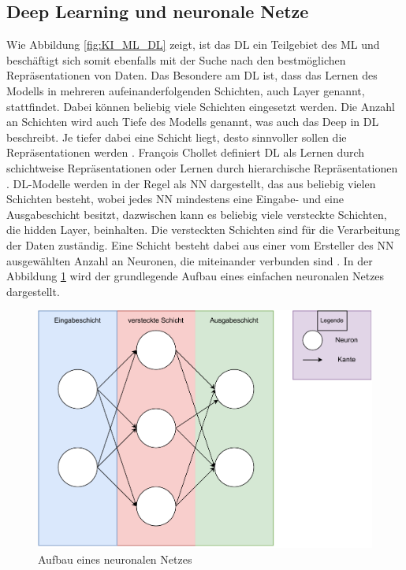 \subsection{Deep Learning und neuronale Netze}
\label{chap:DL}
Wie Abbildung \ref*{fig:KI_ML_DL} zeigt, ist das \ac{DL} ein Teilgebiet des \ac{ML} und beschäftigt sich somit ebenfalls mit der Suche nach den bestmöglichen Repräsentationen von
Daten. Das Besondere am \ac{DL} ist, dass das Lernen des Modells in mehreren aufeinanderfolgenden Schichten, auch Layer genannt, stattfindet. Dabei können
beliebig viele Schichten eingesetzt werden. Die Anzahl an Schichten wird auch Tiefe des Modells genannt, was auch das \glqq Deep\grqq{} in \ac{DL} beschreibt. Je tiefer dabei eine Schicht liegt,
desto sinnvoller sollen die Repräsentationen werden \cite[vgl. S.27]{DL_PY}. François Chollet definiert \ac{DL} als \glqq Lernen durch schichtweise Repräsentationen oder 
Lernen durch hierarchische Repräsentationen\grqq{} \cite[S.27]{DL_PY}. \ac{DL}-Modelle werden in der Regel als \ac{NN} dargestellt, das aus beliebig vielen Schichten besteht, wobei
jedes \ac{NN} mindestens eine Eingabe- und eine Ausgabeschicht  besitzt, dazwischen kann es beliebig viele versteckte Schichten, die hidden Layer, beinhalten. 
Die versteckten Schichten sind für die Verarbeitung der Daten zuständig. Eine Schicht besteht dabei aus einer vom Ersteller des \ac{NN} ausgewählten Anzahl an Neuronen, die miteinander 
verbunden sind \cite[vgl. S.26]{NN}. In der Abbildung \ref*{fig:NN_Modell} wird der grundlegende Aufbau eines einfachen neuronalen Netzes dargestellt. 

\begin{figure}[H]
    \centering
    \includegraphics[scale=0.7]{abbildungen/NN_Modell.pdf}
    \caption{Aufbau eines neuronalen Netzes \cite[S.27]{NN}}
    \label{fig:NN_Modell}
\end{figure}

